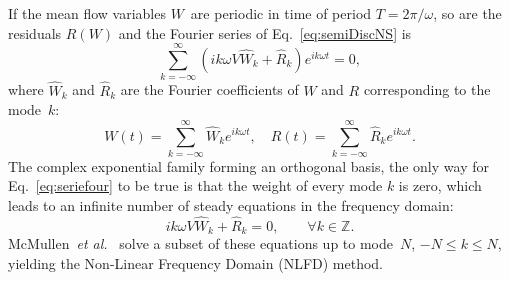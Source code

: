 If the mean flow variables $W$~are periodic in time of period $T =
2\pi/\omega$, so are the residuals $R(W)$ and the Fourier series of
Eq.~\eqref{eq:semiDiscNS} is
\begin{equation}
  \label{eq:seriefour}
  \sum_{k=-\infty}^\infty \left(ik\omega
    V\widehat{W}_k+\widehat{R}_k\right)e^{ik\omega t}=0,
\end{equation}
where $\widehat{W}_k$ and $\widehat{R}_k$ are the Fourier coefficients
of $W$ and $R$ corresponding to the mode~$k$:
\begin{equation}
   W(t) = \sum_{k=-\infty}^{\infty} \widehat{W}_k e^{i k\omega t},\quad
   R(t) = \sum_{k=-\infty}^{\infty} \widehat{R}_k e^{i k\omega t}.
   \label{eq:fourierWsf}
\end{equation}
The complex exponential family forming an orthogonal basis, the only
way for Eq.~\eqref{eq:seriefour} to be true is that the weight of
every mode $k$ is zero, which leads to an infinite number of steady
equations in the frequency domain:
\begin{equation}
  \label{eq:orthodelim}
  ik\omega V\widehat{W}_k+\widehat{R}_k=0, \quad \quad \forall k \in
  \mathbb{Z}.
\end{equation}
McMullen~\emph{et al.}~\cite{McMullen2001,McMullen2002,McMullen2006}
solve a subset of these equations up to mode~$N$, $-N\leq k\leq N$,
yielding the Non-Linear Frequency Domain (NLFD) method.

